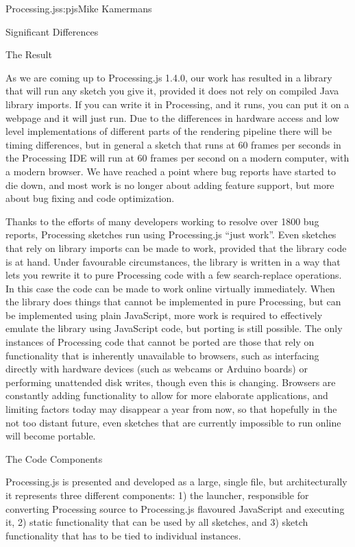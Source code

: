\begin{aosachapter}{Processing.js}{s:pjs}{Mike Kamermans}
\begin{aosasect1}{Significant Differences}
\begin{aosasect2}{The Result}

As we are coming up to Processing.js 1.4.0, our work has resulted in a
library that will run any sketch you give it, provided it does not
rely on compiled Java library imports. If you can write it in
Processing, and it runs, you can put it on a webpage and it will just
run. Due to the differences in hardware access and low level
implementations of different parts of the rendering pipeline there
will be timing differences, but in general a sketch that runs at 60
frames per seconds in the Processing IDE will run at 60 frames per
second on a modern computer, with a modern browser. We have reached a
point where bug reports have started to die down, and most work is no
longer about adding feature support, but more about bug fixing and
code optimization.

Thanks to the efforts of many developers working to resolve over 1800
bug reports, Processing sketches run using Processing.js ``just
work''. Even sketches that rely on library imports can be made to work,
provided that the library code is at hand. Under favourable circumstances,
the library is written in a way that lets you rewrite it to pure
Processing code with a few search-replace operations. In this case the
code can be made to work online virtually immediately. When the
library does things that cannot be implemented in pure Processing, but
can be implemented using plain JavaScript, more work is required to
effectively emulate the library using JavaScript code, but porting is
still possible. The only instances of Processing code that cannot be
ported are those that rely on functionality that is inherently
unavailable to browsers, such as interfacing directly with hardware
devices (such as webcams or Arduino boards) or performing unattended
disk writes, though even this is changing. Browsers are constantly adding
functionality to allow for more elaborate applications, and limiting
factors today may disappear a year from now, so that hopefully in the not
too distant future, even sketches that are currently impossible to run
online will become portable.

\end{aosasect2}

\end{aosasect1}

\begin{aosasect1}{The Code Components}

Processing.js is presented and developed as a large, single file, but
architecturally it represents three different components: 1) the
launcher, responsible for converting Processing source to
Processing.js flavoured JavaScript and executing it, 2) static
functionality that can be used by all sketches, and 3) sketch
functionality that has to be tied to individual instances.


\end{aosasect1}
\end{aosachapter}
